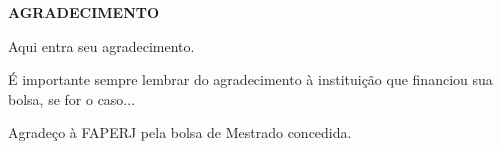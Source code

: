 \begin{center}
\textbf{AGRADECIMENTO}
\end{center}

$\!$\\

Aqui entra seu agradecimento.

É importante sempre lembrar do agradecimento à instituição que financiou sua bolsa, se for o caso...

Agradeço à FAPERJ pela bolsa de Mestrado concedida.